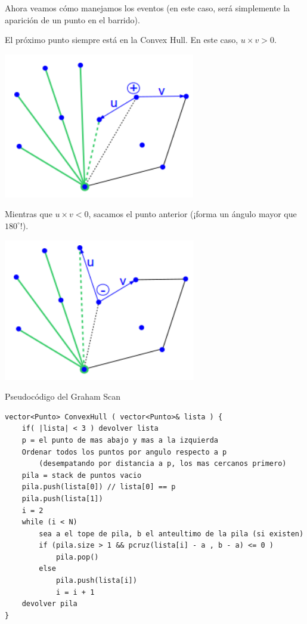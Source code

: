 \documentclass[compress]{beamer}
\begin{document}
\begin{frame}
Ahora veamos c\'omo manejamos los eventos (en este caso, ser\'a simplemente la aparici\'on de un punto en el barrido).\bigskip

El pr\'oximo punto siempre est\'a en la Convex Hull. En este caso, $u\times v > 0$.

\begin{center}
\includegraphics[scale=0.5]{images/convex_hull3.png}
\end{center}

\end{frame}

\begin{frame}
Mientras que $u\times v < 0$, sacamos el punto anterior (¡forma un \'angulo mayor que $180^\circ$!).

\begin{center}
\includegraphics[scale=0.5]{images/convex_hull4.png}
\end{center}

\end{frame}

\begin{frame}[fragile]{Pseudoc\'odigo del Graham Scan}

\begin{lstlisting}
vector<Punto> ConvexHull ( vector<Punto>& lista ) {
    if( |lista| < 3 ) devolver lista
    p = el punto de mas abajo y mas a la izquierda
    Ordenar todos los puntos por angulo respecto a p
        (desempatando por distancia a p, los mas cercanos primero)
    pila = stack de puntos vacio
    pila.push(lista[0]) // lista[0] == p
    pila.push(lista[1])
    i = 2
    while (i < N)
        sea a el tope de pila, b el anteultimo de la pila (si existen)
        if (pila.size > 1 && pcruz(lista[i] - a , b - a) <= 0 )
            pila.pop()
        else
            pila.push(lista[i])
            i = i + 1
    devolver pila
}
\end{lstlisting}

\end{frame}
\end{document}
